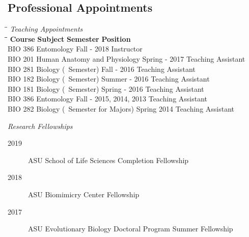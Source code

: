 \documentclass[11pt,a4paper]{extarticle}
\begin{document}
\subsection*{Professional Appointments}
	\begin{tabbing}
		\hspace{5cm}\=\hspace{7.75cm}\=\kill
		\textit{Teaching Appointments}\\
		\hspace{2cm}\=\hspace{6.5cm}\=\hspace{4cm}\=\kill
		\textbf{Course} \> \textbf{Subject} \> \textbf{Semester} \> \textbf{Position}\\
		BIO 386 \> Entomology \> Fall - 2018 \> Instructor \\ 
		BIO 201 \> Human Anatomy and Physiology \> Spring - 2017 \> Teaching Assistant \\
		BIO 281 \> Biology (~Semester) \> Fall - 2016 \> Teaching Assistant \\
		BIO 182 \> Biology (~Semester) \> Summer - 2016 \> Teaching Assistant \\
		BIO 181 \> Biology (~Semester) \> Spring - 2016 \> Teaching Assistant \\
		BIO 386 \> Entomology \> Fall - 2015, 2014, 2013 \> Teaching Assistant \\
		BIO 282 \> Biology (~Semester for Majors) \> Spring 2014 \> Teaching Assistant\\
	\end{tabbing}
	\vspace{-1.5em}
	\textit{Research Fellowships}
	\begin{description}
		\item [2019] ASU School of Life Sciences Completion Fellowship
		\item [2018] ASU Biomimicry Center Fellowship
		\item [2017] ASU Evolutionary Biology Doctoral Program Summer Fellowship
	\end{description}
\end{document}
